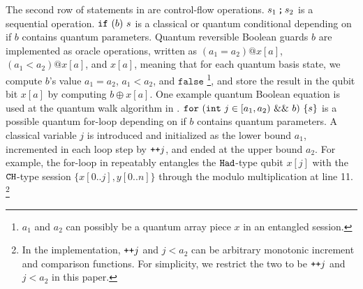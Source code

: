 The second row of statements in  are control-flow operations.
${s_1}\,\texttt{;}\,{s_2}$ is a sequential operation.
$\texttt{if}~{(b)}~{s}$ is a classical or quantum conditional depending on if $b$ contains quantum parameters.
Quantum reversible Boolean guards $b$ are implemented as \oqasm oracle operations, written as $(a_1 = a_2) @ x[a]$, $(a_1 < a_2) @ x[a]$, and $x[a]$, meaning that for each quantum basis state, we compute $b$'s value $a_1 = a_2$, $a_1 < a_2$, and $\texttt{false}$ \footnote{$a_1$ and $a_2$ can possibly be a quantum array piece $x$ in an entangled session.}, and store the result in the qubit bit $x[a]$ by computing $b \oplus x[a]$.
One example quantum Boolean equation is used at the quantum walk algorithm in .
$\texttt{for}~{(\texttt{int}~j \in [a_1,a_2)~\&\&~b)}~\{s\}$ is a possible quantum for-loop depending on if $b$ contains quantum parameters.
A classical variable $j$ is introduced and initialized as the lower bound $a_1$, incremented in each loop step by $\texttt{++}j$, and ended at the upper bound $a_2$.
For example, the for-loop in  repeatably entangles the $\texttt{Had}$-type qubit $x[j]$ with the $\texttt{CH}$-type session $\{x[0..j],y[0..n]\}$ through the modulo multiplication at line 11. 
\footnote{In the \qafny implementation, $\texttt{++}j$ and $j<a_2$ can be arbitrary monotonic increment and comparison functions. For simplicity, we restrict the two to be $\texttt{++}j$ and $j<a_2$ in this paper.}

